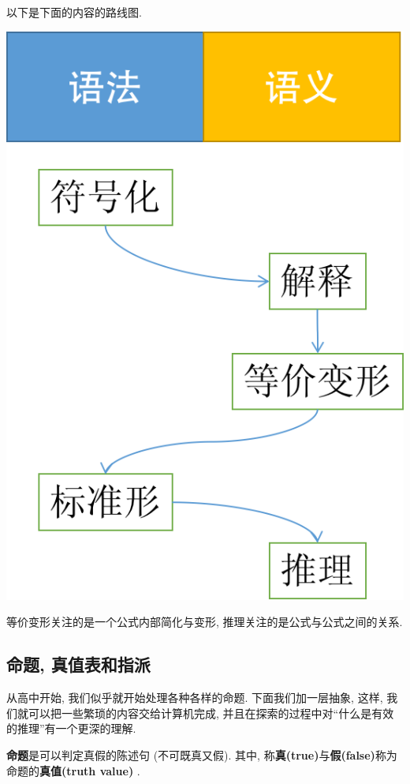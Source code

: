 \begin{idea}
	以下是下面的内容的路线图. 
	
	\centering
	
	\includegraphics[scale=0.4]{2-prop-logic/figs/road-map}
	
	等价变形关注的是一个公式内部简化与变形, 推理关注的是公式与公式之间的关系. 
\end{idea}

\subsection{命题, 真值表和指派}

从高中开始, 我们似乎就开始处理各种各样的命题. 下面我们加一层抽象, 这样, 我们就可以把一些繁琐的内容交给计算机完成, 并且在探索的过程中对``什么是有效的推理''有一个更深的理解. 


\begin{definition}[命题(proposition)]
	{\bf 命题}是可以判定真假的陈述句 (不可既真又假). 其中, 称{\bf 真(true)}与{\bf 假(false)}称为命题的{\bf 真值(truth value) }. 
\end{definition}

